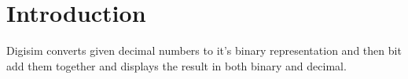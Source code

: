 \hypertarget{index_intro_sec}{}\section{Introduction}\label{index_intro_sec}
Digisim converts given decimal numbers to it's binary representation and then bit add them together and displays the result in both binary and decimal. 